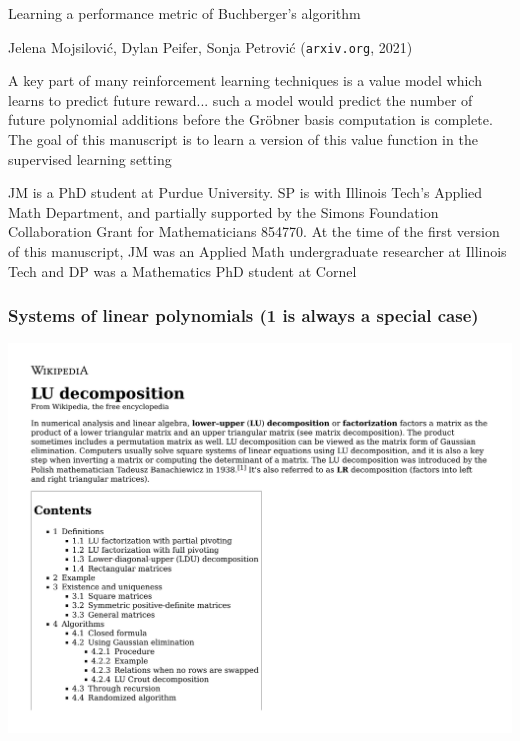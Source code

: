 \documentclass{beamer}
\begin{document}
\begin{frame}

\begin{exampleblock}{Learning a performance metric of Buchberger's algorithm

Jelena Mojsilovi\'c, Dylan Peifer, Sonja Petrovi\'c ({\tt arxiv.org}, 2021)
}
A key part of many reinforcement learning techniques
is a value model which learns to predict future reward...
such a model would predict the number of future polynomial
additions before the Gr\"obner basis computation is complete. The goal of this manuscript is
to learn a version of this value function in the supervised learning setting
\end{exampleblock}

\begin{exampleblock}{}
JM is a PhD student at Purdue University. SP is with Illinois Tech's Applied Math Department, and
partially supported by the Simons Foundation Collaboration Grant for Mathematicians 854770. At the time
of the first version of this manuscript, JM was an Applied Math undergraduate researcher at Illinois Tech and
DP was a Mathematics PhD student at Cornel
\end{exampleblock}

\end{frame}

\begin{frame}
\frametitle{Systems of linear polynomials (1 is always a special case)}

\includegraphics[width=\textwidth, page=13]{LU decomposition - Wikipedia.pdf}
\end{frame}
\end{document}
